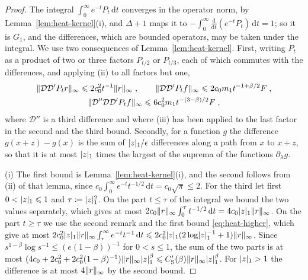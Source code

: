 \documentclass[11pt]{preprint}
\newcommand{\dd}{\mathrm{d}}
\DeclarePairedDelimiter{\abs}{\lvert}{\rvert}
\DeclarePairedDelimiter{\norm}{\lVert}{\rVert}
\numberwithin{equation}{section}
\begin{document}
\begin{proof}
The integral $\int_0^\infty e^{-t}P_t\,\dd t$ converges in the operator norm, by Lemma~\ref{lem:heat-kernel}(i), and $\Delta + 1$ maps it to $-\int_0^\infty\frac{\dd}{\dd t}(e^{-t}P_t)\,\dd t = 1$; so it is $G_1$, and the differences, which are bounded operators, may be taken under the integral. We use two consequences of Lemma~\ref{lem:heat-kernel}. First, writing $P_t$ as a product of two or three factors $P_{t/2}$ or $P_{t/3}$, each of which commutes with the differences, and applying (ii) to all factors but one,
\begin{equation}\label{eq:heat-higher}
\begin{gathered}
    \norm{\mathcal D\mathcal D'P_tr}_\infty \leqslant 2c_0^2t^{-1}\norm r_\infty\;,
    \qquad
    \norm{\mathcal D\mathcal D'P_tf}_\infty \leqslant 2c_0m_1t^{-1+\beta/2}F\;,\\
    \norm{\mathcal D''\mathcal D\mathcal D'P_tf}_\infty \leqslant 6c_0^2m_1t^{-(3-\beta)/2}F\;,
\end{gathered}
\end{equation}
where $\mathcal D''$ is a third difference and where (iii) has been applied to the last factor in the second and the third bound. Secondly, for a function $g$ the difference $g(x + z) - g(x)$ is the sum of $\abs z_1/\epsilon$ differences along a path from $x$ to $x + z$, so that it is at most $\abs z_1$ times the largest of the suprema of the functions $\partial_\lambda g$.

(i) The first bound is Lemma~\ref{lem:heat-kernel}(i), and the second follows from (ii) of that lemma, since $c_0\int_0^\infty e^{-t}t^{-1/2}\,\dd t = c_0\sqrt\pi \leqslant 2$. For the third let first $0 < \abs z_1 \leqslant 1$ and $\tau \coloneqq \abs z_1^2$. On the part $t \leqslant \tau$ of the integral we bound the two values separately, which gives at most $2c_0\norm r_\infty\int_0^\tau t^{-1/2}\,\dd t = 4c_0\abs z_1\norm r_\infty$. On the part $t \geqslant \tau$ we use the second remark and the first bound \eqref{eq:heat-higher}, which give at most $2c_0^2\abs z_1\norm r_\infty\int_\tau^\infty e^{-t}t^{-1}\,\dd t \leqslant 2c_0^2\abs z_1(2\log\abs z_1^{-1} + 1)\norm r_\infty$. Since $s^{1-\beta}\log s^{-1} \leqslant (e(1 - \beta))^{-1}$ for $0 < s \leqslant 1$, the sum of the two parts is at most $(4c_0 + 2c_0^2 + 2c_0^2(1 - \beta)^{-1})\norm r_\infty\abs z_1^\beta \leqslant C'_{\mathrm S}(\beta)\norm r_\infty\abs z_1^\beta$. For $\abs z_1 > 1$ the difference is at most $4\norm r_\infty$ by the second bound.


\end{proof}
\end{document}
